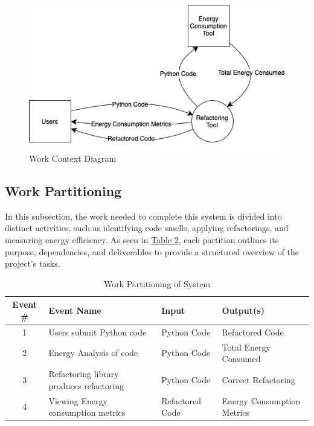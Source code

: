 \documentclass[12pt]{article}
\begin{document}
\begin{figure}[H]
  \centering
  \includegraphics[scale=0.5]{../Images/WorkContextModel.png}
  \caption{Work Context Diagram}
  \label{img:work-context}
\end{figure}

\newpage
\subsection{Work Partitioning}
In this subsection, the work needed to complete this system is
divided into distinct activities, such as identifying code smells,
applying refactorings, and measuring energy efficiency. As seen in
\hyperref[tab:work-part]{Table 2}, each partition outlines its
purpose, dependencies, and deliverables to provide a structured
overview of the project's tasks.

\begin{table}[H]
  \centering
  \setlength\extrarowheight{5mm}
  \begin{tabularx}{\textwidth}{|c|X|l|p{1.5in}|}
    \toprule \textbf{Event \#} & \textbf{Event Name} & \textbf{Input}
    & \textbf{Output(s)} \\
    \midrule
    1 & Users submit Python code & Python Code & Refactored Code\\
    2 & Energy Analysis of code & Python Code & Total Energy Consumed \\
    3 & Refactoring library produces refactoring & Python Code & Correct Refactoring \\
    4 & Viewing Energy consumption metrics & Refactored Code & Energy
    Consumption Metrics \\
    \bottomrule
  \end{tabularx}
  \caption{Work Partitioning of System}
  \label{tab:work-part}
\end{table}
\end{document}
